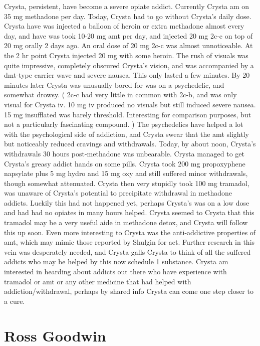 \documentclass[12pt]{book}
\begin{document}
Crysta, persistent, have become a severe opiate addict. Currently Crysta am on 35 mg methadone per day. Today, Crysta had to go without Crysta's daily dose. Crysta have was injected a balloon of heroin or extra methadone almost every day, and have was took 10-20 mg amt per day, and injected 20 mg 2c-c on top of 20 mg orally 2 days ago. An oral dose of 20 mg 2c-c was almost unnoticeable. At the 2 hr point Crysta injected 20 mg with some heroin. The rush of visuals was quite impressive, completely obscured Crysta's vision, and was accompanied by a dmt-type carrier wave and severe nausea. This only lasted a few minutes. By 20 minutes later Crysta was unusually bored for was on a psychedelic, and somewhat drowsy. ( 2c-c had very little in common with 2c-b, and was only visual for Crysta iv. 10 mg iv produced no visuals but still induced severe nausea. 15 mg insufflated was barely threshold. Interesting for comparison purposes, but not a particularly fascinating compound. ) The psychedelics have helped a lot with the psychological side of addiction, and Crysta swear that the amt slightly but noticeably reduced cravings and withdrawals. Today, by about noon, Crysta's withdrawals 30 hours post-methadone was unbearable. Crysta managed to get Crysta's greasy addict hands on some pills. Crysta took 200 mg propoxyphene napsylate plus 5 mg hydro and 15 mg oxy and still suffered minor withdrawals, though somewhat attenuated. Crysta then very stupidly took 100 mg tramadol, was unaware of Crysta's potential to precipitate withdrawal in methadone addicts. Luckily this had not happened yet, perhaps Crysta's was on a low dose and had had no opiates in many hours helped. Crysta seemed to Crysta that this tramadol may be a very useful aide in methadone detox, and Crysta will follow this up soon. Even more interesting to Crysta was the anti-addictive properties of amt, which may mimic those reported by Shulgin for aet. Further research in this vein was desperately needed, and Crysta galls Crysta to think of all the suffered addicts who may be helped by this now schedule 1 substance. Crysta am interested in hearding about addicts out there who have experience with tramadol or amt or any other medicine that had helped with addiction/withdrawal, perhaps by shared info Crysta can come one step closer to a cure.



\chapter{Ross Goodwin}
\end{document}
